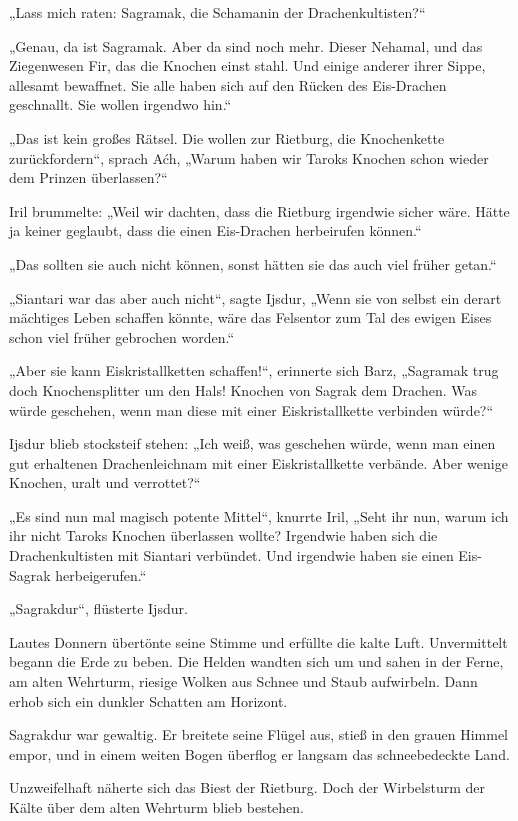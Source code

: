 „Lass mich raten: Sagramak, die Schamanin der Drachenkultisten?“

„Genau, da ist Sagramak. Aber da sind noch mehr. Dieser Nehamal, und das Ziegenwesen Fir, das die Knochen einst stahl. Und einige anderer ihrer Sippe, allesamt bewaffnet. Sie alle haben sich auf den Rücken des Eis-Drachen geschnallt. Sie wollen irgendwo hin.“

„Das ist kein großes Rätsel. Die wollen zur Rietburg, die Knochenkette zurückfordern“, sprach Aćh, „Warum haben wir Taroks Knochen schon wieder dem Prinzen überlassen?“

Iril brummelte: „Weil wir dachten, dass die Rietburg irgendwie sicher wäre. Hätte ja keiner geglaubt, dass die einen Eis-Drachen herbeirufen können.“

„Das sollten sie auch nicht können, sonst hätten sie das auch viel früher getan.“

„Siantari war das aber auch nicht“, sagte Ijsdur, „Wenn sie von selbst ein derart mächtiges Leben schaffen könnte, wäre das Felsentor zum Tal des ewigen Eises schon viel früher gebrochen worden.“

„Aber sie kann Eiskristallketten schaffen!“, erinnerte sich Barz, „Sagramak trug doch Knochensplitter um den Hals! Knochen von Sagrak dem Drachen. Was würde geschehen, wenn man diese mit einer Eiskristallkette verbinden würde?“

Ijsdur blieb stocksteif stehen: „Ich weiß, was geschehen würde, wenn man einen gut erhaltenen Drachenleichnam mit einer Eiskristallkette verbände. Aber wenige Knochen, uralt und verrottet?“

„Es sind nun mal magisch potente Mittel“, knurrte Iril, „Seht ihr nun, warum ich ihr nicht Taroks Knochen überlassen wollte? Irgendwie haben sich die Drachenkultisten mit Siantari verbündet. Und irgendwie haben sie einen Eis-Sagrak herbeigerufen.“

„Sagrakdur“, flüsterte Ijsdur.

Lautes Donnern übertönte seine Stimme und erfüllte die kalte Luft. Unvermittelt begann die Erde zu beben. Die Helden wandten sich um und sahen in der Ferne, am alten Wehrturm, riesige Wolken aus Schnee und Staub aufwirbeln. Dann erhob sich ein dunkler Schatten am Horizont.

Sagrakdur war gewaltig. Er breitete seine Flügel aus, stieß in den grauen Himmel empor, und in einem weiten Bogen überflog er langsam das schneebedeckte Land.

Unzweifelhaft näherte sich das Biest der Rietburg. Doch der Wirbelsturm der Kälte über dem alten Wehrturm blieb bestehen.

